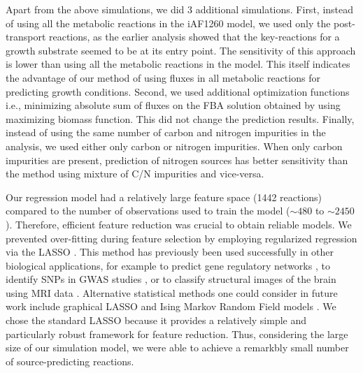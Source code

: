 \documentclass[12pt]{article}
\begin{document}
Apart from the above simulations, we did 3 additional simulations. First, instead of using all the metabolic reactions in the iAF1260 model, we used only the post-transport reactions, as the earlier analysis showed that the key-reactions for a growth substrate seemed to be at its entry point. The sensitivity of this approach is lower than using all the metabolic reactions in the model. This itself indicates the advantage of our method of using fluxes in all metabolic reactions for predicting growth conditions. Second, we used additional optimization functions i.e., minimizing absolute sum of fluxes on the FBA solution obtained by using maximizing biomass function. This did not change the prediction results. Finally, instead of using the same number of carbon and nitrogen impurities in the analysis, we used either only carbon or nitrogen impurities. When only carbon impurities are present, prediction of nitrogen sources has better sensitivity than the method using mixture of C/N impurities and vice-versa.

Our regression model had a relatively large feature space (1442 reactions) compared to the number of observations used to train the model ($\mathord{\sim}480$ to $\mathord{\sim}2450$). Therefore, efficient feature reduction was crucial to obtain reliable models. We prevented over-fitting during feature selection by employing regularized regression via the LASSO \cite{Tibshirani1996}. This method has previously been used successfully in other biological applications, for example to predict gene regulatory networks \cite{Menendezetal2010}, to identify SNPs in GWAS studies \cite{Wuetal2009}, or to classify structural images of the brain using MRI data \cite{Casanovaetal2011,Casanovaetal2012,Wangetal2012}. Alternative statistical methods one could consider in future work include graphical LASSO \cite{Friedmanetal2008} and Ising Markov Random Field models \cite{Ravikumaretal2010}. We chose the standard LASSO because it provides a relatively simple and particularly robust framework for feature reduction. Thus, considering the large size of our simulation model, we were able to achieve a remarkbly small number of source-predicting reactions.
\end{document}
